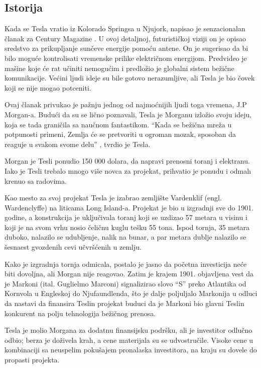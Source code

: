 \documentclass[a4paper]{article}
\begin{document}
\subsection{Istorija}
\label{subsec:istorija}
Kada se Tesla vratio iz Kolorado Springsa u Njujork, napisao je senzacionalan članak za Century Magazine \cite{teslinClanak}. U ovoj detaljnoj, futurističkoj viziji on je opisao sredstvo za prikupljanje sunčeve energije pomoću antene. On je sugerisao da bi bilo moguće kontrolisati vremenske prilike električnom energijom. Predvideo je mašine koje će rat učiniti nemogućim i predložio je globalni sistem bežične komunikacije. Većini ljudi ideje su bile gotovo nerazumljive, ali Tesla je bio čovek koji se nije mogao potceniti.

Ovaj članak privukao je pažnju jednog od najmoćnijih ljudi toga vremena, J.P Morgan-a. Budući da su se lično poznavali, Tesla je Morganu izložio svoju ideju, koja se tada graničila sa naučnom fantastikom. “Kada se bežična mreža u potpunosti primeni, Zemlja će se pretvoriti u ogroman mozak, sposoban da reaguje u svakom svome delu” \cite{intervju1926}, tvrdio je Tesla.

Morgan je Tesli ponudio 150 000 dolara, da napravi prenosni toranj i elektranu. Iako je Tesli trebalo mnogo više novca za projekat, prihvatio je ponudu i odmah krenuo sa radovima.


Kao mesto za svoj projekat Tesla je izabrao zemljište Vardenklif (engl. Wardenclyffe) na liticama Long Island-a. Projekat je bio u izgradnji sve do 1901. godine, a konstrukcija je uključivala toranj koji se uzdizao 57 metara u visinu i koji je na svom vrhu nosio čeličnu kuglu tešku 55 tona. Ispod tornja, 35 metara duboko, nalazilo se udubljenje, nalik na bunar, a par metara dublje nalazilo se šesnaest gvozdenih cevi učvršćenih u zemlju.

Kako je izgradnja tornja odmicala, postalo je jasno da početna investicija neće biti dovoljna, ali Morgan nije reagovao. Zatim je krajem 1901. objavljena vest da je Markoni (ital. Guglielmo Marconi) signalizirao slovo “S” preko Atlantika od Kornvola u Engleskoj do Njufaundlenda, što je dalje poljuljalo Markonija u odluci da nastavi da finansira Teslin projekat buduci da je Markoni bio glavni Teslin konkurent na polju tehnologija bežičnog prenosa.

Tesla je molio Morgana za dodatnu finansijsku podršku, ali je investitor odlučno odbio; berza je doživela krah, a cene materijala su se udvostručile. Visoke cene u kombinaciji sa neuspelim pokušajem pronalaska investitora, na kraju su dovele do propasti projekta.
\end{document}

